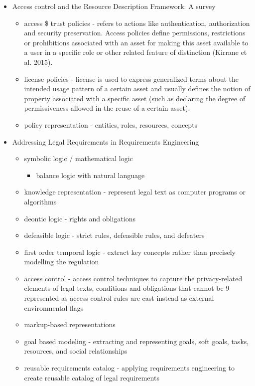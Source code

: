 \begin{itemize}
\item Access control and the Resource Description Framework: A survey
	\begin{itemize}
	\item access \$ trust policies - refers to actions like authentication, authorization and security preservation. Access policies define permissions, restrictions or prohibitions associated with an asset for making this asset available to a user in a specific role or other related feature of distinction (Kirrane et al. 2015). 
	\item license policies -  license is used to express generalized terms about the intended usage pattern of a certain asset and usually defines the notion of property associated with a specific asset (such as declaring the degree of permissiveness allowed in the reuse of a certain asset). 
	\item policy representation - entities, roles, resources, concepts
	\end{itemize}
\item Addressing Legal Requirements in Requirements Engineering
	\begin{itemize}
	\item symbolic logic / mathematical logic
		\begin{itemize}
		\item balance logic with natural language
		\end{itemize}
	\item knowledge representation - represent legal text as computer programs or algorithms
	\item deontic logic - rights and obligations
	\item defeasible logic - strict rules, defeasible rules, and defeaters
	\item first order temporal logic - extract key concepts rather than precisely modelling the regulation
	\item access control - access control techniques to capture the privacy-related elements of legal texts, conditions and obligations that cannot be 9 represented as access control rules are cast instead as external environmental flags
	\item markup-based representations
	\item goal based modeling - extracting and representing goals, soft goals, tasks, resources, and social relationships
	\item reusable requirements catalog - applying requirements engineering to create reusable catalog of legal requirements

\end{itemize}
\end{itemize}
